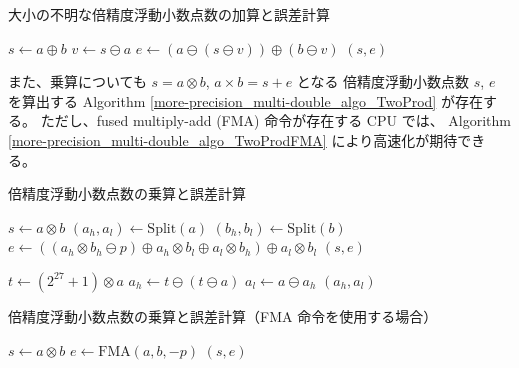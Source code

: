 \begin{algorithm}[t]
    \caption{大小の不明な倍精度浮動小数点数の加算と誤差計算\cite[Algorithm 4]{Hida2001}}
    \label{more-precision_multi-double_algo_TwoSum}
    \begin{algorithmic}
        \State $s \gets a \oplus b$
        \State $v \gets s \ominus a$
        \State $e \gets (a \ominus (s \ominus v)) \oplus (b \ominus v)$
        \State \Return $(s, e)$
        \EndProcedure
    \end{algorithmic}
\end{algorithm}

また、乗算についても
$s = a \otimes b$, $a \times b = s + e$ となる
倍精度浮動小数点数 $s$, $e$ を算出する
Algorithm \ref{more-precision_multi-double_algo_TwoProd} が存在する。
ただし、fused multiply-add (FMA) 命令が存在する CPU では、
Algorithm \ref{more-precision_multi-double_algo_TwoProdFMA} により高速化が期待できる。

\begin{algorithm}[t]
    \caption{倍精度浮動小数点数の乗算と誤差計算\cite[Algorithm 5, 6]{Hida2001}}
    \label{more-precision_multi-double_algo_TwoProd}
    \begin{algorithmic}
        \State $s \gets a \otimes b$
        \State $(a_h, a_l) \gets \text{Split}(a)$
        \State $(b_h, b_l) \gets \text{Split}(b)$
        \State $e \gets ((a_h \otimes b_h \ominus p) \oplus a_h \otimes b_l \oplus a_l \otimes b_h) \oplus a_l \otimes b_l$
        \State \Return $(s, e)$
        \EndProcedure
    \end{algorithmic}
    \begin{algorithmic}
        \State $t \gets (2^{27} + 1) \otimes a$
        \State $a_h \gets t \ominus (t \ominus a)$
        \State $a_l \gets a \ominus a_h$
        \State \Return $(a_h, a_l)$
        \EndProcedure
    \end{algorithmic}
\end{algorithm}

\begin{algorithm}[t]
    \caption{倍精度浮動小数点数の乗算と誤差計算（FMA 命令を使用する場合）\cite[Algorithm 7]{Hida2001}}
    \label{more-precision_multi-double_algo_TwoProdFMA}
    \begin{algorithmic}
        \State $s \gets a \otimes b$
        \State $e \gets \text{FMA}(a, b, -p)$
        \State \Return $(s, e)$
        \EndProcedure
    \end{algorithmic}
\end{algorithm}
